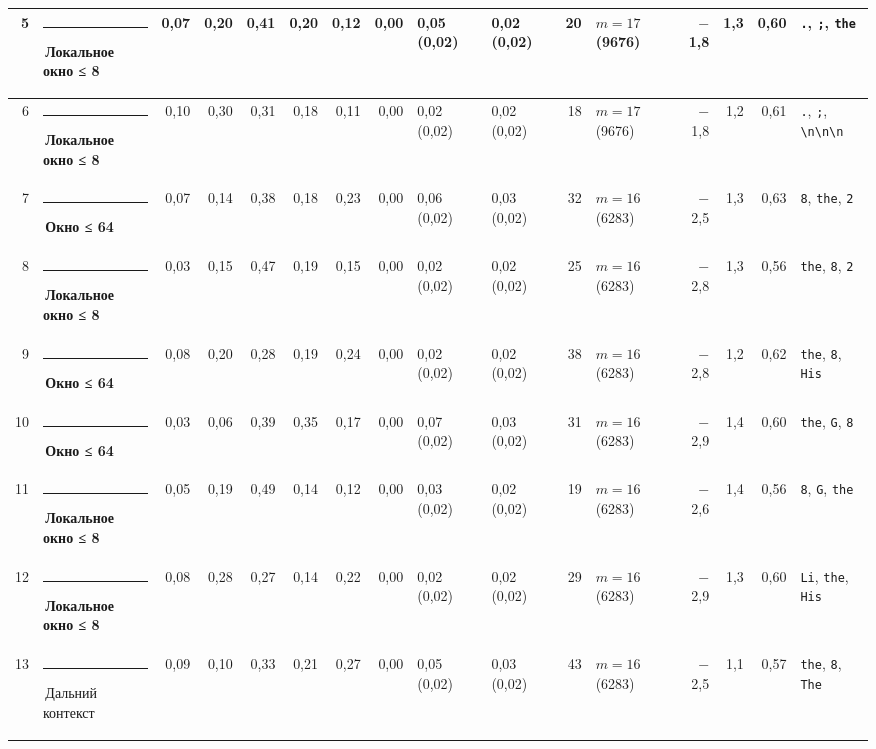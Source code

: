 \documentclass[10pt]{article}
\begin{document}
\begin{minipage}{\linewidth}
\begin{center}
{\begin{tabular}{|r|l|r|r|r|r|r|r|l|l|r|l|r|r|r|l|}
5 & \textcolor[HTML]{1BAF7A}{\rule{0.62em}{0.62em}}\,\textbf{Локальное окно ≤ 8} & 0,07 & 0,20 & 0,41 & 0,20 & 0,12 & 0,00 & 0,05 (0,02) & 0,02 (0,02) & 20 & $m{=}17$ (9676) & $-$1,8 & 1,3 & 0,60 & \texttt{\textvisiblespace{}.}, \texttt{\textvisiblespace{};}, \texttt{\textvisiblespace{}the} \\ \hline
6 & \textcolor[HTML]{1BAF7A}{\rule{0.62em}{0.62em}}\,\textbf{Локальное окно ≤ 8} & 0,10 & 0,30 & 0,31 & 0,18 & 0,11 & 0,00 & 0,02 (0,02) & 0,02 (0,02) & 18 & $m{=}17$ (9676) & $-$1,8 & 1,2 & 0,61 & \texttt{\textvisiblespace{}.}, \texttt{\textvisiblespace{};}, \texttt{\textvisiblespace{}\textbackslash{}n\textbackslash{}n\textbackslash{}n} \\ \hline
7 & \textcolor[HTML]{EDA100}{\rule{0.62em}{0.62em}}\,\textbf{Окно ≤ 64} & 0,07 & 0,14 & 0,38 & 0,18 & 0,23 & 0,00 & 0,06 (0,02) & 0,03 (0,02) & 32 & $m{=}16$ (6283) & $-$2,5 & 1,3 & 0,63 & \texttt{8}, \texttt{\textvisiblespace{}the}, \texttt{2} \\ \hline
8 & \textcolor[HTML]{1BAF7A}{\rule{0.62em}{0.62em}}\,\textbf{Локальное окно ≤ 8} & 0,03 & 0,15 & 0,47 & 0,19 & 0,15 & 0,00 & 0,02 (0,02) & 0,02 (0,02) & 25 & $m{=}16$ (6283) & $-$2,8 & 1,3 & 0,56 & \texttt{\textvisiblespace{}the}, \texttt{8}, \texttt{2} \\ \hline
9 & \textcolor[HTML]{EDA100}{\rule{0.62em}{0.62em}}\,\textbf{Окно ≤ 64} & 0,08 & 0,20 & 0,28 & 0,19 & 0,24 & 0,00 & 0,02 (0,02) & 0,02 (0,02) & 38 & $m{=}16$ (6283) & $-$2,8 & 1,2 & 0,62 & \texttt{\textvisiblespace{}the}, \texttt{8}, \texttt{\textvisiblespace{}His} \\ \hline
10 & \textcolor[HTML]{EDA100}{\rule{0.62em}{0.62em}}\,\textbf{Окно ≤ 64} & 0,03 & 0,06 & 0,39 & 0,35 & 0,17 & 0,00 & 0,07 (0,02) & 0,03 (0,02) & 31 & $m{=}16$ (6283) & $-$2,9 & 1,4 & 0,60 & \texttt{\textvisiblespace{}the}, \texttt{\textvisiblespace{}G}, \texttt{8} \\ \hline
11 & \textcolor[HTML]{1BAF7A}{\rule{0.62em}{0.62em}}\,\textbf{Локальное окно ≤ 8} & 0,05 & 0,19 & 0,49 & 0,14 & 0,12 & 0,00 & 0,03 (0,02) & 0,02 (0,02) & 19 & $m{=}16$ (6283) & $-$2,6 & 1,4 & 0,56 & \texttt{8}, \texttt{\textvisiblespace{}G}, \texttt{\textvisiblespace{}the} \\ \hline
12 & \textcolor[HTML]{1BAF7A}{\rule{0.62em}{0.62em}}\,\textbf{Локальное окно ≤ 8} & 0,08 & 0,28 & 0,27 & 0,14 & 0,22 & 0,00 & 0,02 (0,02) & 0,02 (0,02) & 29 & $m{=}16$ (6283) & $-$2,9 & 1,3 & 0,60 & \texttt{\textvisiblespace{}Li}, \texttt{\textvisiblespace{}the}, \texttt{\textvisiblespace{}His} \\ \hline
13 & \textcolor[HTML]{C3C2B7}{\rule{0.62em}{0.62em}}\,Дальний контекст & 0,09 & 0,10 & 0,33 & 0,21 & 0,27 & 0,00 & 0,05 (0,02) & 0,03 (0,02) & 43 & $m{=}16$ (6283) & $-$2,5 & 1,1 & 0,57 & \texttt{\textvisiblespace{}the}, \texttt{8}, \texttt{\textvisiblespace{}The} \\ \hline
\hline\end{tabular}}\end{center}
\end{minipage}
\end{document}
